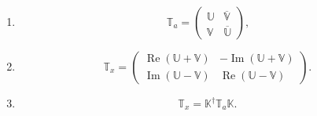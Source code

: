 \documentclass[aps, preprint]{revtex4}
\begin{document}
\begin{enumerate}
\item
\begin{equation}\mathbb{T}_{a} =\left (\begin{array}{cc}\mathbb{U} & \overline{\mathbb{V}} \\
\mathbb{V} & \overline{\mathbb{U}}\end{array}\right )\text{,}
\end{equation}

\item
\begin{equation}\mathbb{T}_{x} =\left (\begin{array}{cc}\ensuremath{\operatorname*{Re}} \left (\mathbb{U} +\mathbb{V}\right ) &  -\ensuremath{\operatorname*{Im}} \left (\mathbb{U} +\mathbb{V}\right ) \\
\ensuremath{\operatorname*{Im}} \left (\mathbb{U} -\mathbb{V}\right ) & \ensuremath{\operatorname*{Re}} \left (\mathbb{U} -\mathbb{V}\right )\end{array}\right )\text{.}
\end{equation}

\item
\begin{equation}\mathbb{T}_{x} =\mathbb{K}^{ \dag } \mathbb{T}_{a} \mathbb{K}\text{.}
\end{equation}


\end{enumerate}
\end{document}
